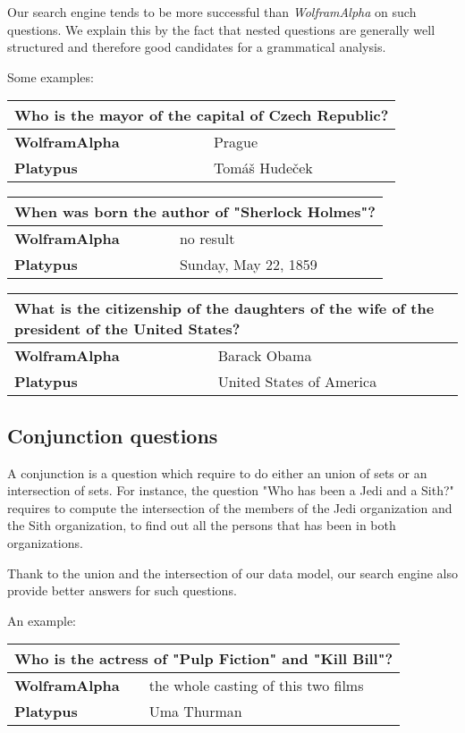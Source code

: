 Our search engine tends to be more successful than \emph{WolframAlpha}
on such questions. We explain this by the fact that nested questions are generally
well structured and therefore good candidates for a grammatical analysis.

Some examples:

\begin{tabular}{l|l}
    \multicolumn{2}{l}{Who is the mayor of the capital of Czech Republic?} \\
    \hline
    \textbf{WolframAlpha} & Prague\\
    \textbf{Platypus} & Tomáš Hudeček\\
\end{tabular}

\begin{tabular}{l|l}
    \multicolumn{2}{l}{When was born the author of "Sherlock Holmes"?} \\
    \hline
    \textbf{WolframAlpha} & no result\\
    \textbf{Platypus} & Sunday, May 22, 1859\\
\end{tabular}

\begin{tabular}{l|l}
    \multicolumn{2}{l}{What is the citizenship of the daughters of the wife of the president of the United States?} \\
    \hline
    \textbf{WolframAlpha} & Barack Obama\\
    \textbf{Platypus} & United States of America\\
\end{tabular}

\subsection{Conjunction questions}

A conjunction is a question which require to do either an union of sets or an intersection
of sets. For instance, the question "Who has been a Jedi and a Sith?" requires to
compute the intersection of the members of the Jedi organization and the Sith organization,
to find out all the persons that has been in both organizations.

Thank to the union and the intersection of our data model, our search engine also
provide better answers for such questions.

An example:

\begin{tabular}{l|l}
    \multicolumn{2}{l}{Who is the actress of "Pulp Fiction" and "Kill Bill"?} \\
    \hline
    \textbf{WolframAlpha} & the whole casting of this two films\\
    \textbf{Platypus} & Uma Thurman\\
\end{tabular}


